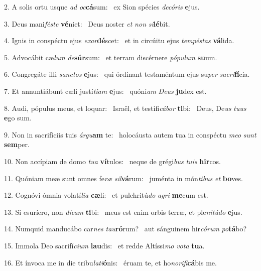 2. A solis ortu usque \textit{ad} \textit{oc}\textbf{cá}sum: \ast\  ex Sion spécies \textit{de}\textit{có}\textit{ris} \textbf{e}jus.\

3. Deus mani\textit{fés}\textit{te} \textbf{vé}niet: \ast\  Deus noster \textit{et} \textit{non} \textit{si}\textbf{lé}bit.\

4. Ignis in conspéctu ejus \textit{ex}\textit{ar}\textbf{dé}scet: \ast\  et in circúitu ejus \textit{tem}\textit{pés}\textit{tas} \textbf{vá}lida.\

5. Advocábit cæ\textit{lum} \textit{de}\textbf{súr}sum: \ast\  et terram discérnere \textit{pó}\textit{pu}\textit{lum} \textbf{su}um.\

6. Congregáte illi \textit{sanc}\textit{tos} \textbf{e}jus: \ast\  qui órdinant testaméntum ejus su\textit{per} \textit{sa}\textit{cri}\textbf{fí}cia.\

7. Et annuntiábunt cæli justí\textit{ti}\textit{am} \textbf{e}jus: \ast\  quóni\textit{am} \textit{De}\textit{us} \textbf{ju}dex est.\

8. Audi, pópulus meus, et loquar: \dag\  Israël, et testifi\textit{cá}\textit{bor} \textbf{ti}bi: \ast\  Deus, De\textit{us} \textit{tu}\textit{us} \textbf{e}go sum.\

9. Non in sacrifíciis tuis \textit{ár}\textit{gu}\textbf{am} te: \ast\  holocáusta autem tua in conspéctu \textit{me}\textit{o} \textit{sunt} \textbf{sem}per.\

10. Non accípiam de domo \textit{tu}\textit{a} \textbf{ví}tulos: \ast\  neque de grégi\textit{bus} \textit{tu}\textit{is} \textbf{hir}cos.\

11. Quóniam meæ sunt omnes fe\textit{ræ} \textit{sil}\textbf{vá}rum: \ast\  juménta in món\textit{ti}\textit{bus} \textit{et} \textbf{bo}ves.\

12. Cognóvi ómnia volatí\textit{li}\textit{a} \textbf{cæ}li: \ast\  et pulchritú\textit{do} \textit{a}\textit{gri} \textbf{me}cum est.\

13. Si esuríero, non \textit{di}\textit{cam} \textbf{ti}bi: \ast\  meus est enim orbis terræ, et ple\textit{ni}\textit{tú}\textit{do} \textbf{e}jus.\

14. Numquid manducábo car\textit{nes} \textit{tau}\textbf{ró}rum? \ast\  aut sánguinem hir\textit{có}\textit{rum} \textit{po}\textbf{tá}bo?\

15. Immola Deo sacrifí\textit{ci}\textit{um} \textbf{lau}dis: \ast\  et redde Altíssi\textit{mo} \textit{vo}\textit{ta} \textbf{tu}a.\

16. Et ínvoca me in die tribu\textit{la}\textit{ti}\textbf{ó}nis: \ast\  éruam te, et ho\textit{no}\textit{ri}\textit{fi}\textbf{cá}bis me.\

